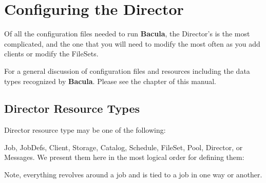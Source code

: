 
\chapter{Configuring the Director}
\label{DirectorChapter}

Of all the configuration files needed to run {\bf Bacula}, the Director's is
the most complicated, and the one that you will need to modify the most often
as you add clients or modify the FileSets. 

For a general discussion of configuration files and resources including the
data types recognized by {\bf Bacula}. Please see the 
 chapter of this manual. 

\section{Director Resource Types}

Director resource type may be one of the following: 

Job, JobDefs, Client, Storage, Catalog, Schedule, FileSet, Pool, Director,  or
Messages. We present them here in the most logical order for defining them: 

Note, everything revolves around a job and is tied to a job in one
way or another.

